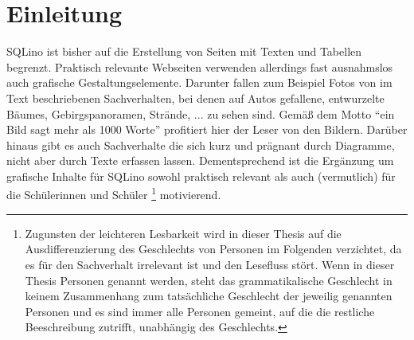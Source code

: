 \section{Einleitung}
\label{sec:introduction}

SQLino ist bisher auf die Erstellung von Seiten mit Texten und Tabellen
begrenzt. Praktisch relevante Webseiten verwenden allerdings fast ausnahmslos
auch grafische Gestaltungselemente. Darunter fallen zum Beispiel Fotos von im
Text beschriebenen Sachverhalten, bei denen auf Autos gefallene, entwurzelte
Bäumes, Gebirgspanoramen, Strände, ... zu sehen sind. Gemäß dem Motto
\enquote{ein Bild sagt mehr als 1000 Worte} profitiert hier der Leser von den
Bildern. Darüber hinaus gibt es auch Sachverhalte die sich kurz und prägnant
durch Diagramme, nicht aber durch Texte erfassen lassen. Dementsprechend ist die
Ergänzung um grafische Inhalte für SQLino sowohl praktisch relevant als auch
(vermutlich) für die Schülerinnen und Schüler \footnote{Zugunsten der leichteren
  Lesbarkeit wird in dieser Thesis auf die Ausdifferenzierung des Geschlechts
  von Personen im Folgenden verzichtet, da es für den Sachverhalt irrelevant ist
  und den Lesefluss stört.  Wenn in dieser Thesis Personen genannt werden, steht
  das grammatikalische Geschlecht in keinem Zusammenhang zum tatsächliche
  Geschlecht der jeweilig genannten Personen und es sind immer alle Personen
  gemeint, auf die die restliche Beeschreibung zutrifft, unabhängig des
  Geschlechts.} motivierend.

